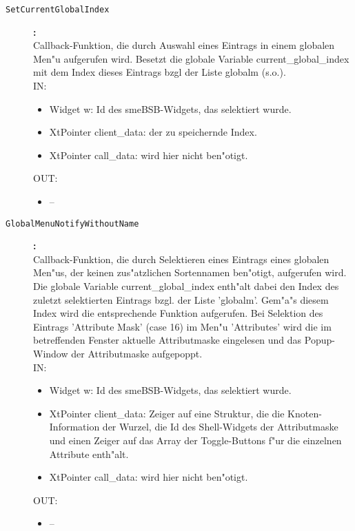 \begin{description}
\item[\tt SetCurrentGlobalIndex]{\bf :\\}
Callback-Funktion, die durch Auswahl eines Eintrags in einem globalen Men"u aufgerufen wird. Besetzt die globale Variable current\_global\_index mit dem Index dieses Eintrags bzgl der Liste globalm (s.o.). \\
IN:
\begin{itemize}
   \item Widget w:      Id des smeBSB-Widgets, das selektiert wurde. \item XtPointer client\_data: der zu speichernde Index. \item XtPointer call\_data:   wird hier nicht ben"otigt.
\end{itemize}
OUT:
\begin{itemize}
   \item --
\end{itemize}

\item[\tt GlobalMenuNotifyWithoutName]{\bf :\\}
Callback-Funktion, die durch Selektieren eines Eintrags eines globalen Men"us, der keinen zus"atzlichen Sortennamen ben"otigt, aufgerufen wird. Die globale Variable current\_global\_index enth"alt dabei den Index des zuletzt selektierten Eintrags bzgl. der Liste 'globalm'. Gem"a"s diesem Index wird die entsprechende Funktion aufgerufen. Bei Selektion des Eintrags 'Attribute Mask' (case 16) im Men"u 'Attributes' wird die im betreffenden Fenster aktuelle Attributmaske eingelesen und das Popup-Window der Attributmaske aufgepoppt. \\
IN:
\begin{itemize}
   \item Widget w:      Id des smeBSB-Widgets, das selektiert wurde. \item XtPointer client\_data: Zeiger auf eine Struktur, die die Knoten-Information der Wurzel, die Id des Shell-Widgets der Attributmaske und einen Zeiger auf das Array der Toggle-Buttons f"ur die einzelnen Attribute enth"alt. \item XtPointer call\_data:   wird hier nicht ben"otigt.
\end{itemize}
OUT:
\begin{itemize}
   \item --
\end{itemize}


\end{description}
